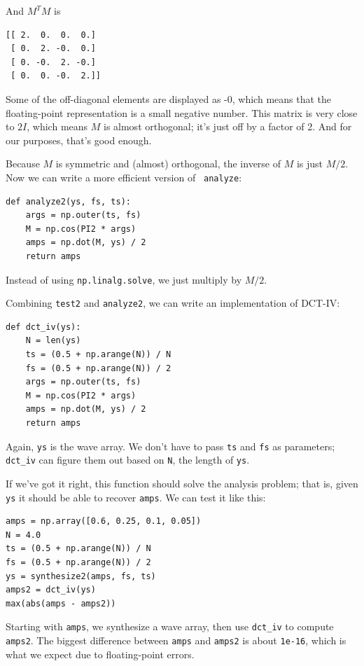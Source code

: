 \documentclass[12pt]{book}
\begin{document}
And $M^TM$ is

\begin{verbatim}
[[ 2.  0.  0.  0.]
 [ 0.  2. -0.  0.]
 [ 0. -0.  2. -0.]
 [ 0.  0. -0.  2.]]
\end{verbatim}

Some of the off-diagonal elements are displayed as -0, which means
that the floating-point representation is a small negative number.
This matrix is very close to $2I$, which means $M$ is almost
orthogonal; it's just off by a factor of 2.  And for our purposes,
that's good enough.

Because $M$ is symmetric and (almost) orthogonal, the inverse of $M$
is just $M/2$.  Now we can write a more efficient version of {\tt
  analyze}:

\begin{verbatim}
def analyze2(ys, fs, ts):
    args = np.outer(ts, fs)
    M = np.cos(PI2 * args)
    amps = np.dot(M, ys) / 2
    return amps
\end{verbatim}

Instead of using {\tt np.linalg.solve}, we just multiply
by $M/2$.

Combining {\tt test2} and {\tt analyze2}, we can write an
implementation of DCT-IV:

\begin{verbatim}
def dct_iv(ys):
    N = len(ys)
    ts = (0.5 + np.arange(N)) / N
    fs = (0.5 + np.arange(N)) / 2
    args = np.outer(ts, fs)
    M = np.cos(PI2 * args)
    amps = np.dot(M, ys) / 2
    return amps
\end{verbatim}

Again, {\tt ys} is the wave array.  We don't have to pass
{\tt ts} and {\tt fs} as parameters; \verb"dct_iv" can
figure them out based on {\tt N}, the length of {\tt ys}.

If we've got it right, this function should solve the analysis
problem; that is, given {\tt ys} it should be able to recover
{\tt amps}.  We can test it like this:

\begin{verbatim}
amps = np.array([0.6, 0.25, 0.1, 0.05])
N = 4.0
ts = (0.5 + np.arange(N)) / N
fs = (0.5 + np.arange(N)) / 2
ys = synthesize2(amps, fs, ts)
amps2 = dct_iv(ys)
max(abs(amps - amps2))
\end{verbatim}

Starting with {\tt amps}, we synthesize a wave array, then use
\verb"dct_iv" to compute {\tt amps2}.  The biggest
difference between {\tt amps} and {\tt amps2} is about {\tt 1e-16},
which is what we expect due to floating-point errors.
\end{document}
